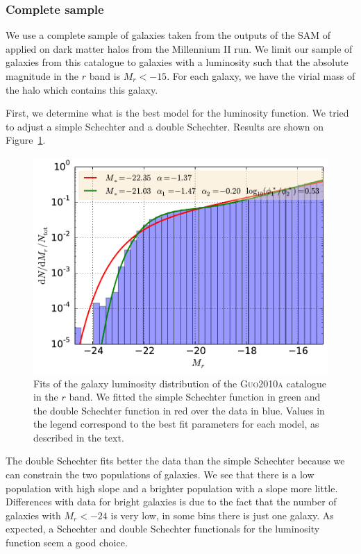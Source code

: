 \subsubsection{Complete sample}
%
We use a complete sample of galaxies taken from the outputs of the SAM of
\citet{Guo+11} applied on dark matter halos from the Millennium II run. We
limit our sample of galaxies from this catalogue to galaxies with a
luminosity such that the absolute magnitude in the $r$ band is $M_r<-15$.
For each galaxy, we have the virial mass of the halo which contains this
galaxy.

First, we determine what is the best model for the luminosity function. We
tried to adjust a simple Schechter and a double Schechter. Results are
shown on Figure~\ref{fig:guo_all}.
%
\begin{figure}
    \centering
    \includegraphics[width=0.7\linewidth]{figures/lf/guo_all}
    \caption{Fits of the galaxy luminosity distribution of the
        \textsc{Guo2010a} catalogue in the $r$ band. We fitted the simple
        Schechter function in green and the double Schechter function in red
        over the data in blue. Values in the legend correspond to the best fit
        parameters for each model, as described in the text.\label{fig:guo_all}}
\end{figure}
%
%
The double Schechter fits better the data than the simple Schechter because
we can constrain the two populations of galaxies. We see that there is a low
population with high slope and a brighter population with a slope more
little. Differences with data for bright galaxies is due to the fact that
the number of galaxies with $M_r<-24$ is very low, in some bins there is
just one galaxy.
%
As expected, a Schechter and double Schechter functionals for the
luminosity function seem a good choice.

